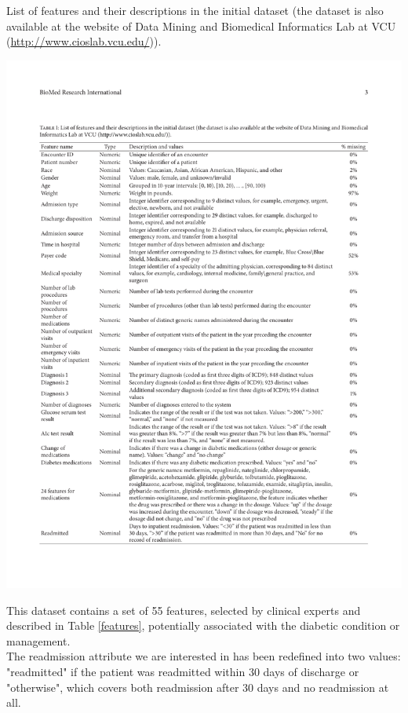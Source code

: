 \documentclass[12pt]{article}
\begin{document}
\begin{table}[t!]
   \centering
    \caption{\small List of features and their descriptions in the initial dataset (the dataset is also available at the website of Data Mining and Biomedical Informatics Lab at VCU (\url{http://www.cioslab.vcu.edu/})).}
    \vspace{0.2cm}
    \includegraphics[width=15cm]{features.pdf}
    \label{features}
\end{table}

This dataset contains a set of 55 features, selected by clinical experts and described in Table \ref{features}, potentially associated with the diabetic condition or management. \\
The readmission attribute we are interested in has been redefined into two values: "readmitted" if the patient was readmitted within 30 days of discharge or "otherwise", which covers both readmission after 30 days and no readmission at all.
\end{document}
